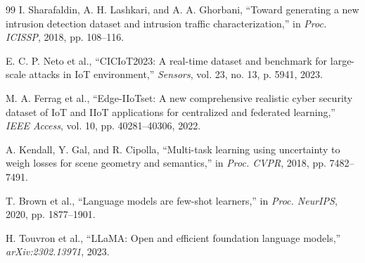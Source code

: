 \documentclass[journal]{IEEEtran}
\begin{document}
\begin{thebibliography}{99}
I. Sharafaldin, A. H. Lashkari, and A. A. Ghorbani, ``Toward generating a new intrusion detection dataset and intrusion traffic characterization,'' in \emph{Proc. ICISSP}, 2018, pp. 108--116.

E. C. P. Neto et al., ``CICIoT2023: A real-time dataset and benchmark for large-scale attacks in IoT environment,'' \emph{Sensors}, vol. 23, no. 13, p. 5941, 2023.

M. A. Ferrag et al., ``Edge-IIoTset: A new comprehensive realistic cyber security dataset of IoT and IIoT applications for centralized and federated learning,'' \emph{IEEE Access}, vol. 10, pp. 40281--40306, 2022.

A. Kendall, Y. Gal, and R. Cipolla, ``Multi-task learning using uncertainty to weigh losses for scene geometry and semantics,'' in \emph{Proc. CVPR}, 2018, pp. 7482--7491.

T. Brown et al., ``Language models are few-shot learners,'' in \emph{Proc. NeurIPS}, 2020, pp. 1877--1901.

H. Touvron et al., ``LLaMA: Open and efficient foundation language models,'' \emph{arXiv:2302.13971}, 2023.

\end{thebibliography}
\end{document}
